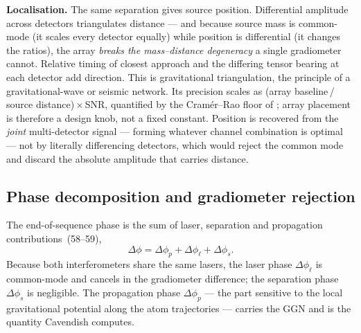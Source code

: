 \documentclass[11pt,a4paper]{article}
\theoremstyle{reqstyle}
\begin{document}
\textbf{Localisation.} The same separation gives source position. Differential amplitude
across detectors triangulates distance --- and because source mass is common-mode (it scales
every detector equally) while position is differential (it changes the ratios), the array
\emph{breaks the mass--distance degeneracy} a single gradiometer cannot. Relative timing of
closest approach and the differing tensor bearing at each detector add direction. This is
gravitational triangulation, the principle of a gravitational-wave or seismic network. Its
precision scales as (array baseline\,/\,source distance)\,$\times$\,SNR, quantified by the
Cram\'er--Rao floor of ; array placement is therefore a design knob, not a
fixed constant. Position is recovered from the \emph{joint} multi-detector signal --- forming
whatever channel combination is optimal --- not by literally differencing detectors, which
would reject the common mode and discard the absolute amplitude that carries distance.

\subsection{Phase decomposition and gradiometer rejection}
The end-of-sequence phase is the sum of laser, separation and propagation
contributions~(58--59),
\begin{equation}
\Delta\phi = \Delta\phi_p + \Delta\phi_\ell + \Delta\phi_s .
\end{equation}
Because both interferometers share the same lasers, the laser phase $\Delta\phi_\ell$ is
common-mode and cancels in the gradiometer difference; the separation phase $\Delta\phi_s$
is negligible. The propagation phase $\Delta\phi_p$ --- the part sensitive to the local
gravitational potential along the atom trajectories --- carries the GGN and is the quantity
Cavendish computes.
\end{document}
